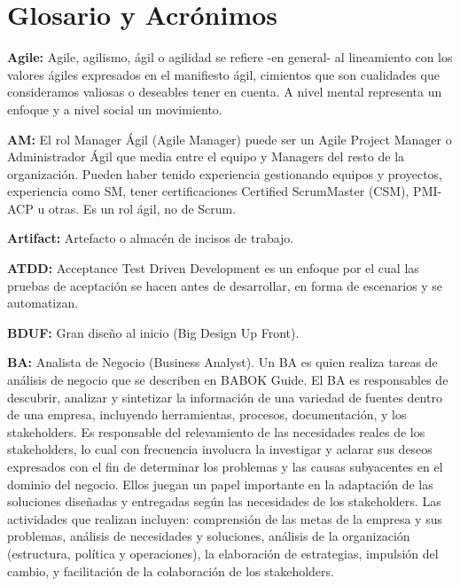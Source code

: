 \chapter{Glosario y Acrónimos}


  \begin{description}    
  
  \item {\textbf{Agile:} Agile, agilismo, ágil o agilidad se refiere -en general- al lineamiento con los valores ágiles expresados en el manifiesto ágil, cimientos que son cualidades que consideramos valiosas o deseables tener en cuenta. A nivel mental representa un enfoque y a nivel social un movimiento.}
  
  \item {\textbf{AM:} El rol Manager Ágil (Agile Manager) puede ser un Agile Project Manager o Administrador Ágil que media entre el equipo y Managers del resto de la organización. Pueden haber tenido experiencia gestionando equipos y proyectos, experiencia como SM, tener certificaciones Certified ScrumMaster (CSM), PMI-ACP u otras. Es un rol ágil, no de Scrum. } 
   
  \item {\textbf{Artifact:} Artefacto o almacén de incisos de trabajo.}  
 
  \item {\textbf{ATDD:}  Acceptance Test Driven Development es un enfoque por el cual las pruebas de aceptación se hacen antes de desarrollar, en forma de escenarios y se automatizan.}
 
  \item {\textbf{BDUF:} Gran diseño al inicio (Big Design Up Front).}  
  
  \item {\textbf{BA:} Analista de Negocio (Business Analyst). Un BA es quien realiza tareas de análisis de negocio que se describen en BABOK Guide. El BA es responsables de descubrir, analizar y sintetizar la información de una variedad de fuentes dentro de una empresa, incluyendo herramientas, procesos, documentación, y los stakeholders. Es responsable del relevamiento de las necesidades reales de los stakeholders, lo cual con frecuencia involucra la investigar y aclarar sus deseos expresados con el fin de determinar los problemas y las causas subyacentes en el dominio del negocio. Ellos juegan un papel importante en la adaptación de las soluciones diseñadas y entregadas según las necesidades de los stakeholders. Las actividades que realizan incluyen: comprensión de las metas de la empresa y sus problemas, análisis de necesidades y soluciones, análisis de la organización (estructura, política y operaciones), la elaboración de estrategias, impulsión del cambio, y facilitación de la colaboración de los stakeholders.}


\end{description}
